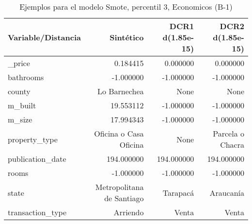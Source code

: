\begin{table}[H]
\centering
\fontsize{10}{14}\selectfont
\caption{Ejemplos para el modelo Smote, percentil 3, Economicos (B-1)}
\label{table-example-economicos-b-1-smote-enc-3p}
\begin{tabular}{|l|r|r|r|}
\hline
\rowcolor[gray]{0.8}
Variable/Distancia & Sintético & DCR1 d(1.85e-15) & DCR2 d(1.85e-15) \\
\hline \_price & \cellcolor[rgb]{0.9, 0.54, 0.52} 0.184415 & \cellcolor[rgb]{0.9, 0.54, 0.52} 0.000000 & \cellcolor[rgb]{0.9, 0.54, 0.52} 0.000000 \\
\hline bathrooms & \cellcolor[rgb]{0.9, 0.54, 0.52} -1.000000 & \cellcolor[rgb]{0.9, 0.54, 0.52} -1.000000 & \cellcolor[rgb]{0.9, 0.54, 0.52} -1.000000 \\
\hline county & \cellcolor[rgb]{0.9, 0.54, 0.52} Lo Barnechea & None & None \\
\hline m\_built & \cellcolor[rgb]{0.9, 0.54, 0.52} 19.553112 & -1.000000 & -1.000000 \\
\hline m\_size & \cellcolor[rgb]{0.9, 0.54, 0.52} 17.994343 & -1.000000 & -1.000000 \\
\hline property\_type & \cellcolor[rgb]{0.9, 0.54, 0.52} Oficina o Casa Oficina & None & Parcela o Chacra \\
\hline publication\_date & \cellcolor[rgb]{0.9, 0.54, 0.52} 194.000000 & \cellcolor[rgb]{0.9, 0.54, 0.52} 194.000000 & \cellcolor[rgb]{0.9, 0.54, 0.52} 194.000000 \\
\hline rooms & \cellcolor[rgb]{0.9, 0.54, 0.52} -1.000000 & \cellcolor[rgb]{0.9, 0.54, 0.52} -1.000000 & \cellcolor[rgb]{0.9, 0.54, 0.52} -1.000000 \\
\hline state & \cellcolor[rgb]{0.9, 0.54, 0.52} Metropolitana de Santiago & Tarapacá & Araucanía \\
\hline transaction\_type & \cellcolor[rgb]{0.9, 0.54, 0.52} Arriendo & Venta & Venta \\
\hline
\end{tabular}
\end{table}
